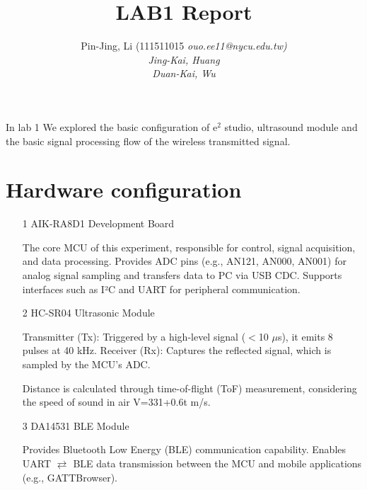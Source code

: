 \documentclass[10pt]{article}
\title{\vspace{-0.2em} \huge LAB1 Report}
\author{Pin-Jing, Li (111511015 \it{ouo.ee11@nycu.edu.tw})\\ 
Jing-Kai, Huang\\ 
Duan-Kai, Wu}
\begin{document}
\maketitle


In lab 1 We explored the basic configuration of $\mathrm{e}^2$ studio, ultrasound module and the basic signal processing flow of the wireless transmitted signal.



\section{Hardware configuration}
\begin{itemize}
\item[1] AIK-RA8D1 Development Board

The core MCU of this experiment, responsible for control, signal acquisition, and data processing.
Provides ADC pins (e.g., AN121, AN000, AN001) for analog signal sampling and transfers data to PC via USB CDC.
Supports interfaces such as I²C and UART for peripheral communication.

\item[2]HC-SR04 Ultrasonic Module

Transmitter (Tx): Triggered by a high-level signal ($<$10 $\mu$s), it emits 8 pulses at 40 kHz.
Receiver (Rx): Captures the reflected signal, which is sampled by the MCU’s ADC.

Distance is calculated through time-of-flight (ToF) measurement, considering the speed of sound in air 
V=331+0.6t m/s.

\item[3]DA14531 BLE Module

Provides Bluetooth Low Energy (BLE) communication capability.
Enables UART $\rightleftarrows$ BLE data transmission between the MCU and mobile applications (e.g., GATTBrowser).
\end{itemize}
\end{document}
